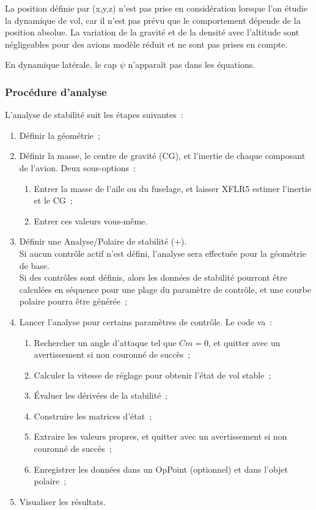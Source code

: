 \documentclass[a4paper,twoside,12pt,dvips]{article}
\begin{document}
La position définie par (x,y,z) n’est pas prise en considération lorsque
l’on étudie la dynamique de vol, car il n’est pas prévu que le comportement 
dépende de la position absolue. La variation de la gravité et de la densité
avec l’altitude sont négligeables pour des avions modèle réduit et ne sont 
pas prises en compte.

En dynamique latérale, le cap \textrm{${\psi}$} n’apparaît pas dans les
équations.

\subsubsection{Procédure d’analyse}

L’analyse de stabilité suit les étapes suivantes~:

\begin{enumerate}
  \item Définir la géométrie~;
  \item Définir la masse, le centre de gravité (CG), et l’inertie de
  chaque composant de l’avion. Deux sous-options~:
  \begin{enumerate}
    \item Entrer la masse de l’aile ou du fuselage, et laisser XFLR5 estimer
    l’inertie et le CG~;
    \item Entrer ces valeurs vous-même.
  \end{enumerate}
  \item Définir une Analyse/Polaire de stabilité
  (+).\\
  Si aucun contrôle actif n’est défini, l’analyse sera effectuée pour la
  géométrie de base.\\
  Si des contrôles sont définis, alors les données de stabilité pourront être
  calculées en séquence pour une plage du paramètre de contrôle, et une courbe
  polaire pourra être générée~;
  \item Lancer l’analyse pour certains paramètres de contrôle. Le code va~:
  \begin{enumerate}
    \item Rechercher un angle d’attaque tel que $Cm=0$, et quitter avec
    un avertissement si non couronné de succès~;
    \item Calculer la vitesse de réglage pour obtenir l’état de vol stable~;
    \item Évaluer les dérivées de la stabilité~;
    \item Construire les matrices d’état~;
    \item Extraire les valeurs propres, et quitter avec un avertissement si
    non couronné de succès~;
    \item Enregistrer les données dans un OpPoint (optionnel) et dans l’objet
    polaire~;
  \end{enumerate}
  \item Visualiser les résultats.
\end{enumerate}
\end{document}
